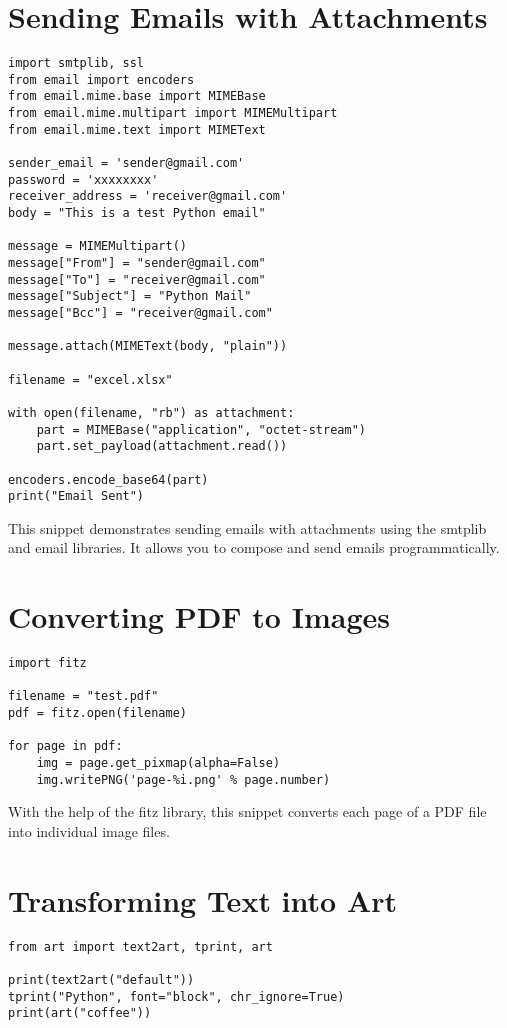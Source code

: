 \section{Sending Emails with Attachments}

\begin{lstlisting}
import smtplib, ssl
from email import encoders
from email.mime.base import MIMEBase
from email.mime.multipart import MIMEMultipart
from email.mime.text import MIMEText

sender_email = 'sender@gmail.com'
password = 'xxxxxxxx'
receiver_address = 'receiver@gmail.com'
body = "This is a test Python email"

message = MIMEMultipart()
message["From"] = "sender@gmail.com"
message["To"] = "receiver@gmail.com"
message["Subject"] = "Python Mail"
message["Bcc"] = "receiver@gmail.com"

message.attach(MIMEText(body, "plain"))

filename = "excel.xlsx"

with open(filename, "rb") as attachment:
    part = MIMEBase("application", "octet-stream")
    part.set_payload(attachment.read())

encoders.encode_base64(part)
print("Email Sent")
\end{lstlisting}

This snippet demonstrates sending emails with attachments using the smtplib and email libraries. It allows you to compose and send emails programmatically.

\section{Converting PDF to Images}

\begin{lstlisting}
import fitz

filename = "test.pdf"
pdf = fitz.open(filename)

for page in pdf:
    img = page.get_pixmap(alpha=False)
    img.writePNG('page-%i.png' % page.number)
\end{lstlisting}

With the help of the fitz library, this snippet converts each page of a PDF file into individual image files.

\section{Transforming Text into Art}


\begin{lstlisting}
from art import text2art, tprint, art

print(text2art("default"))
tprint("Python", font="block", chr_ignore=True)
print(art("coffee"))
\end{lstlisting}

